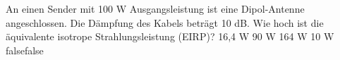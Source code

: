     {An einen Sender mit 100 W Ausgangsleistung ist eine Dipol-Antenne angeschlossen. Die Dämpfung des Kabels beträgt 10 dB. Wie hoch ist die äquivalente isotrope Strahlungsleistung (EIRP)?}
    {16,4 W}
    {90 W}
    {164 W}
    {10 W}
    {false}{false}